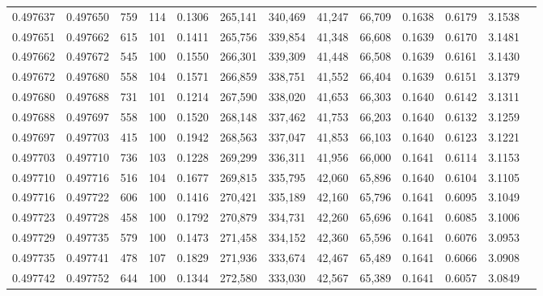 \begin{tabular}{rrrrrrrrrrrrr}
0.497637 & 0.497650 &   759 & 114 &                                     0.1306 & 265,141 & 340,469 &  41,247 &  66,709 & 0.1638 & 0.6179 & 3.1538 \\
0.497651 & 0.497662 &   615 & 101 &                                     0.1411 & 265,756 & 339,854 &  41,348 &  66,608 & 0.1639 & 0.6170 & 3.1481 \\
0.497662 & 0.497672 &   545 & 100 &                                     0.1550 & 266,301 & 339,309 &  41,448 &  66,508 & 0.1639 & 0.6161 & 3.1430 \\
0.497672 & 0.497680 &   558 & 104 &                                     0.1571 & 266,859 & 338,751 &  41,552 &  66,404 & 0.1639 & 0.6151 & 3.1379 \\
0.497680 & 0.497688 &   731 & 101 &                                     0.1214 & 267,590 & 338,020 &  41,653 &  66,303 & 0.1640 & 0.6142 & 3.1311 \\
0.497688 & 0.497697 &   558 & 100 &                                     0.1520 & 268,148 & 337,462 &  41,753 &  66,203 & 0.1640 & 0.6132 & 3.1259 \\
0.497697 & 0.497703 &   415 & 100 &                                     0.1942 & 268,563 & 337,047 &  41,853 &  66,103 & 0.1640 & 0.6123 & 3.1221 \\
0.497703 & 0.497710 &   736 & 103 &                                     0.1228 & 269,299 & 336,311 &  41,956 &  66,000 & 0.1641 & 0.6114 & 3.1153 \\
0.497710 & 0.497716 &   516 & 104 &                                     0.1677 & 269,815 & 335,795 &  42,060 &  65,896 & 0.1640 & 0.6104 & 3.1105 \\
0.497716 & 0.497722 &   606 & 100 &                                     0.1416 & 270,421 & 335,189 &  42,160 &  65,796 & 0.1641 & 0.6095 & 3.1049 \\
0.497723 & 0.497728 &   458 & 100 &                                     0.1792 & 270,879 & 334,731 &  42,260 &  65,696 & 0.1641 & 0.6085 & 3.1006 \\
0.497729 & 0.497735 &   579 & 100 &                                     0.1473 & 271,458 & 334,152 &  42,360 &  65,596 & 0.1641 & 0.6076 & 3.0953 \\
0.497735 & 0.497741 &   478 & 107 &                                     0.1829 & 271,936 & 333,674 &  42,467 &  65,489 & 0.1641 & 0.6066 & 3.0908 \\
0.497742 & 0.497752 &   644 & 100 &                                     0.1344 & 272,580 & 333,030 &  42,567 &  65,389 & 0.1641 & 0.6057 & 3.0849 \\

\end{tabular}
